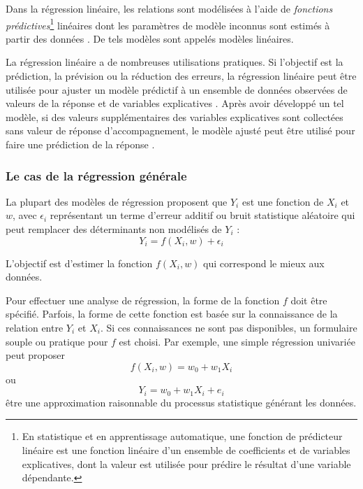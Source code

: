 	Dans la régression linéaire, les relations sont modélisées à l'aide de \textit{fonctions prédictives}\footnote{En statistique et en apprentissage automatique, une fonction de prédicteur linéaire est une fonction linéaire d'un ensemble de coefficients et de variables explicatives, dont la valeur est utilisée pour prédire le résultat d'une variable dépendante.} linéaires dont les paramètres de modèle inconnus sont estimés à partir des données \cite{matloff2017statistical}. De tels modèles sont appelés modèles linéaires.
	
	La régression linéaire a de nombreuses utilisations pratiques. Si l'objectif est la prédiction, la prévision ou la réduction des erreurs, la régression linéaire peut être utilisée pour ajuster un modèle prédictif à un ensemble de données observées de valeurs de la réponse et de variables explicatives \cite{darlington2016regression}. Après avoir développé un tel modèle, si des valeurs supplémentaires des variables explicatives sont collectées sans valeur de réponse d'accompagnement, le modèle ajusté peut être utilisé pour faire une prédiction de la réponse \cite{harrell2001regression}.
	
	

	
	
	\subsubsection{Le cas de la régression générale}
	La plupart des modèles de régression proposent que $Y_{i}$ est une fonction de $X_{i}$ et $w$, avec $\epsilon_{i}$ représentant un terme d'erreur additif ou bruit statistique aléatoire qui peut remplacer des déterminants non modélisés de $Y_{i}$ :
	\begin{equation}
	{\displaystyle Y_{i}=f(X_{i},w )+\epsilon_{i}}
	\end{equation}
	
	L'objectif est d'estimer la fonction ${\displaystyle f(X_{i},w )}$ qui correspond le mieux aux données.
	
	Pour effectuer une analyse de régression, la forme de la fonction $f$ doit être spécifié. Parfois, la forme de cette fonction est basée sur la connaissance de la relation entre $Y_{i}$ et $X_{i}$. 
	Si ces connaissances ne sont pas disponibles, un formulaire souple ou pratique pour $f$ est choisi. Par exemple, une simple régression univariée peut proposer
	$${\displaystyle f(X_{i},w )= w_{0}+ w_{1}X_{i}}$$
	ou
	$${\displaystyle Y_{i}= w_{0}+ w_{1}X_{i}+e_{i}}$$
	être une approximation raisonnable du processus statistique générant les données.
	
